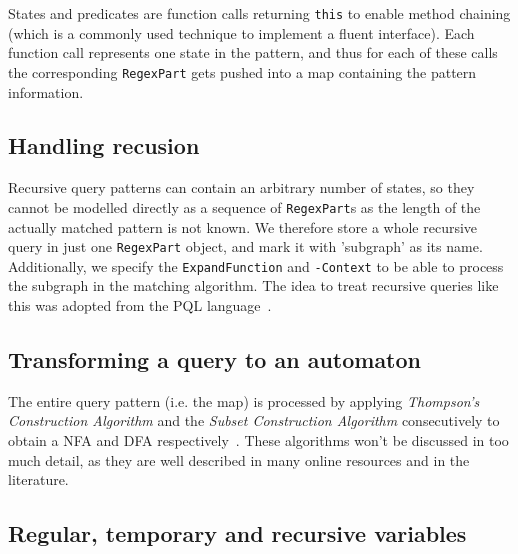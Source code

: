 States and predicates are function calls returning \texttt{this} to enable method chaining (which is a commonly used technique to implement a fluent interface). Each function call represents one state in the pattern, and thus for each of these calls the corresponding \texttt{RegexPart} gets pushed into a map containing the pattern information. 

\subsection*{Handling recusion}

 Recursive query patterns can contain an arbitrary number of states, so they cannot be modelled directly as a sequence of \texttt{RegexPart}s as the length of the actually matched pattern is not known. We therefore store a whole recursive query in just one \texttt{RegexPart} object, and mark it with 'subgraph' as its name. Additionally, we specify the \texttt{ExpandFunction} and \texttt{-Context} to be able to process the subgraph in the matching algorithm. The idea to treat recursive queries like this was adopted from the PQL language~\cite{PQL}. 

\subsection*{Transforming a query to an automaton}

The entire query pattern (i.e. the map) is processed by applying \textit{Thompson's Construction Algorithm} and the \textit{Subset Construction Algorithm} consecutively to obtain a NFA and DFA respectively~\cite{Thompson}. These algorithms won't be discussed in too much detail, as they are well described in many online resources and in the literature. 

\subsection*{Regular, temporary and recursive variables}

